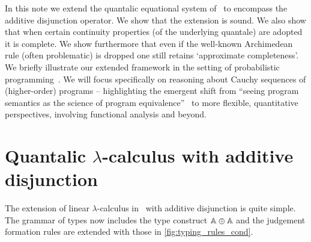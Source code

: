 \documentclass[a4paper,UKenglish,cleveref, autoref, thm-restate]{lipics-v2021}
\begin{document}
In this note we extend the quantalic equational system
of~\cite{dahlqvist22,dahlqvist2023syntactic} to encompass the additive
disjunction operator. We show that the extension is sound. We also show that
when certain continuity properties (of the underlying quantale) are adopted it
is complete. We show furthermore that even if the well-known Archimedean rule
(often problematic) is dropped one still retains `approximate completeness'. We
briefly illustrate our extended framework in the setting of probabilistic
programming~\cite{dahlqvist19,barthe20}. We will focus specifically on
reasoning about Cauchy sequences of (higher-order) programs -- highlighting the
emergent shift from ``seeing program semantics as the science of program
equivalence''~\cite{lago22} to more flexible, quantitative perspectives,
involving functional analysis and beyond.







\section{Quantalic $\lambda$-calculus with additive disjunction }

The extension of linear $\lambda$-calculus
in~\cite{dahlqvist22,dahlqvist2023syntactic} with additive disjunction is quite
simple. The grammar of types now includes the type construct $\mathbb{A} \oplus
\mathbb{A}$ and the judgement formation rules are extended with those in
\autoref{fig:typing_rules_cond}. 
\end{document}
